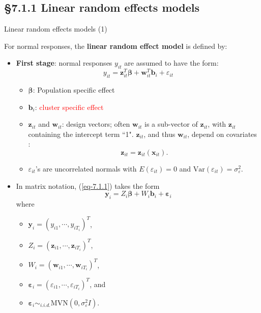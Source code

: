 \documentclass{beamer}
\newcommand{\currentsubsection}{}
\let\oldsubsection\subsection
\renewcommand{\subsection}[1]{\oldsubsection{#1}\renewcommand{\currentsubsection}{#1}}
\newcommand{\boldbeta}{{\boldsymbol \beta}}
\newcommand{\boldvarepsilon}{{\boldsymbol \varepsilon}}
\newenvironment{wideitemize}%
  {\begin{itemize}%
    \setlength{\parskip}{1em}}%
  {\end{itemize}}
\begin{document}
\subsection{\S7.1.1 Linear random effects models}
\begin{frame}{Linear random effects models (1)}


For normal responses, the {\bf linear random effect model} is defined by:
\begin{itemize}
\item
\textbf{First stage}: normal responses $y_{it}$ are assumed to have the form:
\begin{equation}
y_{it}=\mathbf{z}_{it}^T\boldbeta+\mathbf{w}_{it}^T\mathbf{b}_i+\varepsilon_{it}
\label{eq-7.1.1}
\end{equation} 
\begin{itemize}
\item $\boldbeta$: Population specific effect

\item $\mathbf{b}_i$: \textcolor{red}{cluster specific effect}

\item $\mathbf{z}_{it}$ and $\mathbf{w}_{it}$:  design vectors; often $\mathbf{w}_{it}$ is a sub-vector of $\mathbf{z}_{it}$, with $\mathbf{z}_{it}$ containing the intercept term ``1". $\mathbf{z}_{it}$,  and thus $\mathbf{w}_{it}$, depend on  covariates
 :
\[
\mathbf{z}_{it}=\mathbf{z}_{it}(\mathbf{x}_{it}
).
\]

\item 
$\varepsilon_{it}$'s are uncorrelated normals with $E(\varepsilon_{it})=0$ and 
$\text{Var}(\varepsilon_{it})=\sigma^2_{\varepsilon}$.


\end{itemize}

\end{itemize}
\end{frame}

\begin{frame}
\begin{wideitemize}
\item In matrix notation,  (\ref{eq-7.1.1}) takes the form
\begin{equation}\label{eq-7.1.3}
\mathbf{y}_i=Z_i\boldbeta+W_i\mathbf{b}_i+\boldvarepsilon_i
\end{equation}
where 
\begin{wideitemize}
\item
$\mathbf{y}_i=(y_{i1},\cdots, y_{iT_i})^T$, 
\item $Z_i=(\mathbf{z}_{i1}, \cdots, \mathbf{z}_{iT_i})^T$,
\item 
$W_i=(\mathbf{w}_{i1},\cdots, \mathbf{w}_{iT_i})^T$, 
\item $\boldvarepsilon_i=(\varepsilon_{i1}, 
\cdots, \varepsilon_{iT_i})^T$, and
\item  ${\boldsymbol \varepsilon}_i\sim_{i.i.d.} \text{MVN}(0, \sigma^2_\varepsilon I)$.
\end{wideitemize}

\end{wideitemize}
\end{frame}
\end{document}
